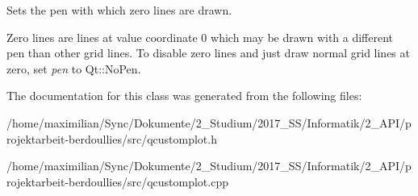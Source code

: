 Sets the pen with which zero lines are drawn.

Zero lines are lines at value coordinate 0 which may be drawn with a different pen than other grid lines. To disable zero lines and just draw normal grid lines at zero, set {\itshape pen} to Qt\+::\+No\+Pen. 

The documentation for this class was generated from the following files\+:\begin{DoxyCompactItemize}
\item 
/home/maximilian/\+Sync/\+Dokumente/2\+\_\+\+Studium/2017\+\_\+\+S\+S/\+Informatik/2\+\_\+\+A\+P\+I/projektarbeit-\/berdoullies/src/qcustomplot.\+h\item 
/home/maximilian/\+Sync/\+Dokumente/2\+\_\+\+Studium/2017\+\_\+\+S\+S/\+Informatik/2\+\_\+\+A\+P\+I/projektarbeit-\/berdoullies/src/qcustomplot.\+cpp\end{DoxyCompactItemize}
